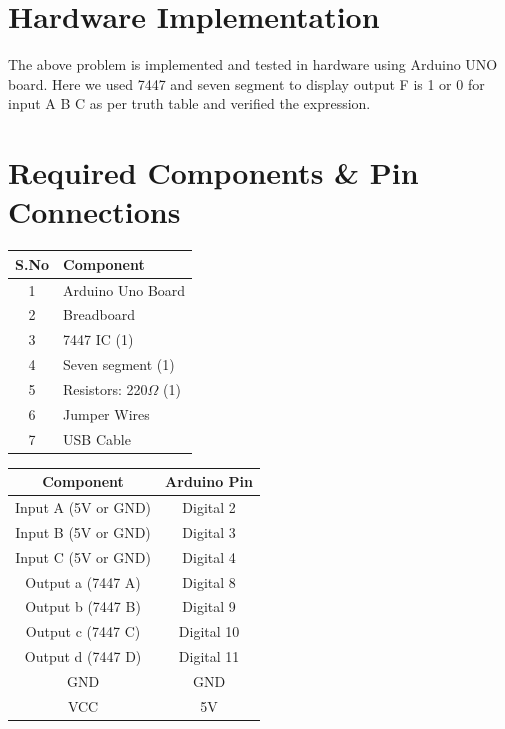 \documentclass[a4paper,12pt]{article}
\begin{document}
\section*{\textbf{Hardware Implementation}}
The above problem is implemented and tested in hardware using Arduino UNO board. Here we used 7447 and seven segment to display output F is 1 or 0 for input A B C as per truth table and verified the expression.
\section*{Required Components \& Pin Connections}
\begin{center}
\begin{minipage}{0.45\textwidth}
\begin{table}[H]
\centering
\begin{tabular}{|c|l|}
\hline
\textbf{S.No} & \textbf{Component} \\ \hline
1 & Arduino Uno Board \\
2 & Breadboard \\
3 & 7447 IC (1) \\
4 & Seven segment (1) \\
5 & Resistors: 220$\Omega$ (1) \\
6 & Jumper Wires \\
7 & USB Cable \\
\hline
\end{tabular}
\end{table}
\end{minipage}
\hspace{0.05\textwidth}
\begin{minipage}{0.45\textwidth}
\begin{table}[H]
\centering
\begin{tabular}{|c|c|}
\hline
\textbf{Component} & \textbf{Arduino Pin} \\ \hline
Input A (5V or GND) & Digital 2 \\
Input B (5V or GND) & Digital 3 \\
Input C (5V or GND) & Digital 4 \\
Output a (7447 A) & Digital 8 \\
Output b (7447 B) & Digital 9 \\
Output c (7447 C) & Digital 10 \\
Output d (7447 D) & Digital 11 \\
GND & GND \\
VCC & 5V \\
\hline
\end{tabular}
\end{table}
\end{minipage}
\end{center}
\end{document}
